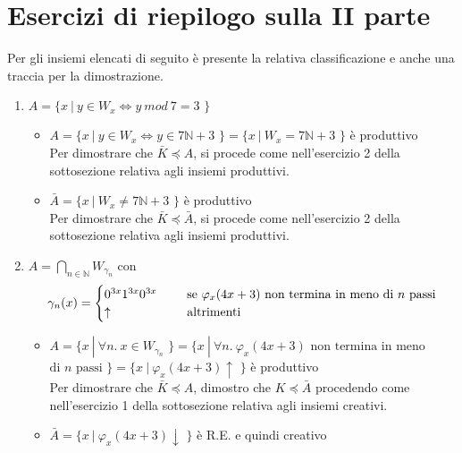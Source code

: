 \documentclass[a4paper,oneside,titlepage]{book}
\begin{document}
\section{Esercizi di riepilogo sulla II parte}
Per gli insiemi elencati di seguito è presente la relativa classificazione e anche una traccia per la dimostrazione.
\begin{enumerate}[label=\fbox{\arabic*}]
\item $A = \text{\{ } x \ | \ y \in W_x \iff y \ mod \ 7 = 3 \text{ \}}$
\begin{itemize}
\item $A = \text{\{ } x \ | \ y \in W_x \iff y \in 7\mathbb{N}+3 \text{ \}} = \text{\{ } x \ | \ W_x = 7\mathbb{N}+3 \text{ \}}$ è produttivo
\\ Per dimostrare che $\bar{K} \preceq A$, si procede come nell'esercizio 2 della sottosezione relativa agli insiemi produttivi.

\item $\bar{A} = \text{\{ } x \ | \ W_x \neq 7\mathbb{N}+3 \text{ \}}$ è produttivo
\\ Per dimostrare che $\bar{K} \preceq \bar{A}$, si procede come nell'esercizio 2 della sottosezione relativa agli insiemi produttivi.
\end{itemize}

\item $A = \bigcap_{n \in \mathbb{N}} W_{\gamma_n}$ con
\[
\gamma_n(x) =
\begin{cases}
0^{3x} 1^{3x} 0^{3x}& \hspace{0.5cm} \text{se } \varphi_x(4x+3) \text{ non termina in meno di $n$ passi} \\
\uparrow& \hspace{0.5cm} \text{altrimenti}
\end{cases}
\]
\begin{itemize}
\item $A = \text{\{ } x \ | \ \forall n. \ x \in W_{\gamma_n} \text{ \}} = \text{\{ } x \ | \ \forall n. \ \varphi_x(4x+3) \text{ non termina in meno}$ $\text{di } n \text{ passi \}} = \text{\{ } x \ | \ \varphi_x(4x+3)\uparrow \text{ \}}$ è produttivo
\\ Per dimostrare che $\bar{K} \preceq A$, dimostro che $K \preceq \bar{A}$ procedendo come nell'esercizio 1 della sottosezione relativa agli insiemi creativi.

\item $\bar{A} = \text{\{ } x \ | \ \varphi_x(4x+3)\downarrow \text{ \}}$ è R.E. e quindi creativo
\end{itemize}


\end{enumerate}
\end{document}
